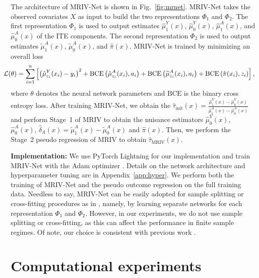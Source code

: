 \documentclass[nonatbib]{article}
\newcommand{\frameworkname}{MRIV\xspace}
\newcommand{\modelname}{\mbox{MRIV-Net}\xspace}
\theoremstyle{definition}
\theoremstyle{plain}
\begin{document}
The architecture of \modelname is shown in Fig.~\ref{fig:mrnet}. \modelname takes the observed covariates $X$ as input to build the two representations $\Phi_1$ and $\Phi_2$. The first representation $\Phi_1$ is used to output estimates $\hat{\mu}_1^Y(x)$, $\hat{\mu}_0^Y(x)$, $\hat{\mu}_1^A(x)$, and $\hat{\mu}_0^A(x)$ of the ITE components. The second representation $\Phi_2$ is used to output estimates $\widetilde{\mu}_1^A(x)$, $\widetilde{\mu}_0^A(x)$, and $\hat{\pi}(x)$. \modelname is trained by minimizing an overall loss
\begin{equation}
\hspace{-0.4cm}
    \mathcal{L}(\theta) = \sum_{i=1}^n \left[ \left(\hat{\mu}_{z_i}^Y(x_i) - y_i \right)^2 + \mathrm{BCE}\left(\hat{\mu}_{z_i}^A(x_i), a_i \right) + \mathrm{BCE}\left(\widetilde{\mu}_{z_i}^A(x_i), a_i \right) +  \mathrm{BCE}\left(\hat{\pi}(x_i), z_i \right) \right],
\end{equation}
where $\theta$ denotes the neural network parameters and $\mathrm{BCE}$ is the binary cross entropy loss. After training \modelname, we obtain the $\hat{\tau}_{\mathrm{init}}(x) = \frac{\hat{\mu}_1^Y(x) - \hat{\mu}_0^Y(x)}{\hat{\mu}_1^A(x) - \hat{\mu}_0^A(x)}$ and perform Stage~1 of \frameworkname to obtain the nuisance estimators $\hat{\mu}_0^Y(x)$, $\hat{\mu}_0^A(x)$, $\hat{\delta}_A(x) = \widetilde{\mu}_1^A(x) - \widetilde{\mu}_0^A(x)$ and $\hat{\pi}(x)$. Then, we perform the Stage~2 pseudo regression of \frameworkname to obtain $\hat{\tau}_{\mathrm{\frameworkname}}(x)$.


\textbf{Implementation:} We use PyTorch Lightning for our implementation and train \modelname with the Adam optimizer \cite{Kingma.2015}. Details  on the network architecture and hyperparameter tuning are in Appendix~\ref*{app:hyper}. We perform both the training of \modelname and the pseudo outcome regression on the full training data. Needless to say, \modelname can be easily adopted for sample splitting or cross-fitting procedures as in \cite{Chernozhukov.2018}, namely, by learning separate networks for each representation $\Phi_1$ and $\Phi_2$. However, in our experiments, we do not use sample splitting or cross-fitting, as this can affect the performance in finite sample regimes. Of note, our choice is consistent with previous work \cite{Curth.2021}.


\section{Computational experiments}
\label{sec:experiments}
\end{document}
